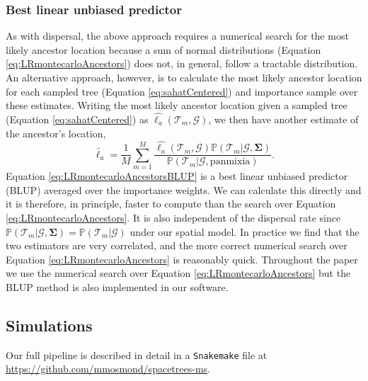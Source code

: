 \documentclass[12pt]{article}
\begin{document}
\subsubsection*{Best linear unbiased predictor}

As with dispersal, the above approach requires a numerical search for the most likely ancestor location because a sum of normal distributions (Equation \eqref{eq:LRmontecarloAncestors}) does not, in general, follow a tractable distribution.
An alternative approach, however, is to calculate the most likely ancestor location for each sampled tree (Equation \eqref{eq:sahatCentered}) and importance sample over these estimates.
Writing the most likely ancestor location given a sampled tree (Equation \ref{eq:sahatCentered}) as $\widehat{\bm{\ell}_a}(\mathcal{T}_m, \mathcal{G})$, we then have another estimate of the ancestor's location,
\begin{equation}\label{eq:LRmontecarloAncestorsBLUP}
\tilde{\bm{\ell}_a} = \frac{1}{M} \sum_{m=1}^{M} \frac{ \widehat{\bm{\ell}_a}(\mathcal{T}_m, \mathcal{G}) \mathbb{P}(\mathcal{T}_m | \mathcal{G}, \mathbf{\Sigma})}{\mathbb{P}(\mathcal{T}_m | \mathcal{G},\mathrm{panmixia})}.
\end{equation}
Equation \eqref{eq:LRmontecarloAncestorsBLUP} is a best linear unbiased predictor (BLUP) averaged over the importance weights. 
We can calculate this directly and it is therefore, in principle, faster to compute than the search over Equation \eqref{eq:LRmontecarloAncestors}. 
It is also independent of the dispersal rate since $\mathbb{P}(\mathcal{T}_m | \mathcal{G}, \mathbf{\Sigma})=\mathbb{P}(\mathcal{T}_m | \mathcal{G})$ under our spatial model.
In practice we find that the two estimators are very correlated, and the more correct numerical search over Equation \eqref{eq:LRmontecarloAncestors} is reasonably quick. 
Throughout the paper we use the numerical search over Equation \eqref{eq:LRmontecarloAncestors} but the BLUP method is also implemented in our software.

\subsection*{Simulations}

Our full pipeline is described in detail in a \texttt{Snakemake} \citep{molder2021sustainable} file at \url{https://github.com/mmosmond/spacetrees-ms}.
\end{document}
